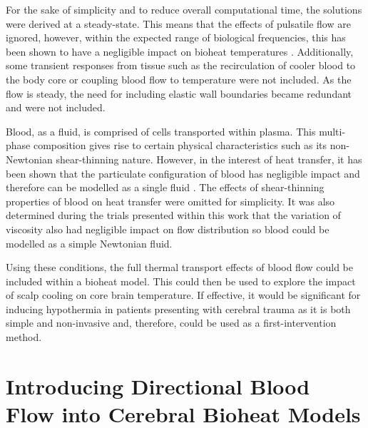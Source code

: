 \documentclass[11pt,english,a4paper,twoside,openright]{report}
\begin{document}
{{{{{{{{	For the sake of simplicity and to reduce overall computational time, the solutions were derived at a steady-state. This means that the effects of pulsatile flow are ignored, however, within the expected range of biological frequencies, this has been shown to have a negligible impact on bioheat temperatures \cite{craciunescu2001pulsatile}. Additionally, some transient responses from tissue such as the recirculation of cooler blood to the body core or coupling blood flow to temperature were not included. As the flow is steady, the need for including elastic wall boundaries became redundant and were not included.
	
	Blood, as a fluid, is comprised of cells transported within plasma. This multi-phase composition gives rise to certain physical characteristics such as its non-Newtonian shear-thinning nature. However, in the interest of heat transfer, it has been shown that the particulate configuration of blood has negligible impact and therefore can be modelled as a single fluid \cite{victor1976steady}\cite{barozzi1991convective}. The effects of shear-thinning properties of blood on heat transfer were omitted for simplicity. It was also determined during the trials presented within this work that the variation of viscosity also had negligible impact on flow distribution so blood could be modelled as a simple Newtonian fluid. 
	
	Using these conditions, the full thermal transport effects of blood flow could be included within a bioheat model. This could then be used to explore the impact of scalp cooling on core brain temperature. If effective, it would be significant for inducing hypothermia in patients presenting with cerebral trauma as it is both simple and non-invasive and, therefore, could be used as a first-intervention method.

\newpage
\thispagestyle{empty}
\chapter[Introducing Directional Blood Flow into Cerebral Bioheat Models]{{\Huge I}ntroducing {\Huge D}irectional {\Huge B}lood {\Huge F}low into {\Huge C}erebral {\Huge B}ioheat {\Huge M}odels}
\thispagestyle{empty}
\label{Sec:2Chapter2}

}}}}}}}}
\end{document}

